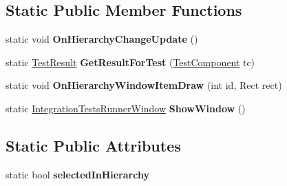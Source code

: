 \subsection*{Static Public Member Functions}
\begin{DoxyCompactItemize}
\item 
\mbox{\label{class_unity_test_1_1_integration_tests_runner_window_ad722cfac333f7e87efa8cf9094601006}} 
static void {\bfseries On\+Hierarchy\+Change\+Update} ()
\item 
\mbox{\label{class_unity_test_1_1_integration_tests_runner_window_a4ecb32244248d7fbf690086b2b499bd4}} 
static \hyperlink{class_unity_test_1_1_test_result}{Test\+Result} {\bfseries Get\+Result\+For\+Test} (\hyperlink{class_unity_test_1_1_test_component}{Test\+Component} tc)
\item 
\mbox{\label{class_unity_test_1_1_integration_tests_runner_window_a3d1584e432d4a6fae472d9a317926691}} 
static void {\bfseries On\+Hierarchy\+Window\+Item\+Draw} (int id, Rect rect)
\item 
\mbox{\label{class_unity_test_1_1_integration_tests_runner_window_a5af6fdeb6a1003067820809b675bccad}} 
static \hyperlink{class_unity_test_1_1_integration_tests_runner_window}{Integration\+Tests\+Runner\+Window} {\bfseries Show\+Window} ()
\end{DoxyCompactItemize}
\subsection*{Static Public Attributes}
\begin{DoxyCompactItemize}
\item 
\mbox{\label{class_unity_test_1_1_integration_tests_runner_window_aa350633970e3c81b7f374924d8156856}} 
static bool {\bfseries selected\+In\+Hierarchy}
\end{DoxyCompactItemize}
